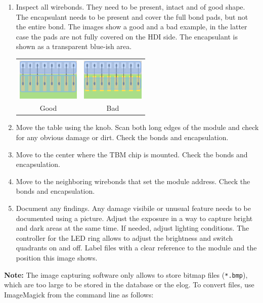 \documentclass[12pt]{unlsilabsop}
\begin{document}
\begin{enumerate}
    \item Inspect all wirebonds. They need to be present, intact and of good shape. The encapsulant needs to be present and cover the full bond pads, but not the entire bond. The images show a good and a bad example, in the latter case the pads are not fully covered on the HDI side. The encapsulant is shown as a transparent blue-ish area.

    \begin{center}
        \begin{tabular}{cc}
        \includegraphics[width=3cm]{img/PottingGood.pdf} & \includegraphics[width=3cm]{img/PottingBad.pdf} \\
        Good & Bad \\
        \end{tabular}
    \end{center}

    \item Move the table using the knob. Scan both long edges of the module and check for any obvious damage or dirt. Check the bonds and encapsulation.
    \item Move to the center where the TBM chip is mounted. Check the bonds and encapsulation.
    \item Move to the neighboring wirebonds that set the module address. Check the bonds and encapsulation.
    \item Document any findings. Any damage visibile or unusual feature needs to be documented using a picture. Adjust the exposure in a way to capture bright and dark areas at the same time. If needed, adjust lighting conditions. The controller for the LED ring allows to adjust the brightness and switch quadrants on and off. Label files with a clear reference to the module and the position this image shows.
\end{enumerate}
\textbf{Note:} The image capturing software only allows to store bitmap files (\texttt{*.bmp}), which are too large to be stored in the database or the elog. To convert files, use ImageMagick from the command line as follows:
\end{document}
